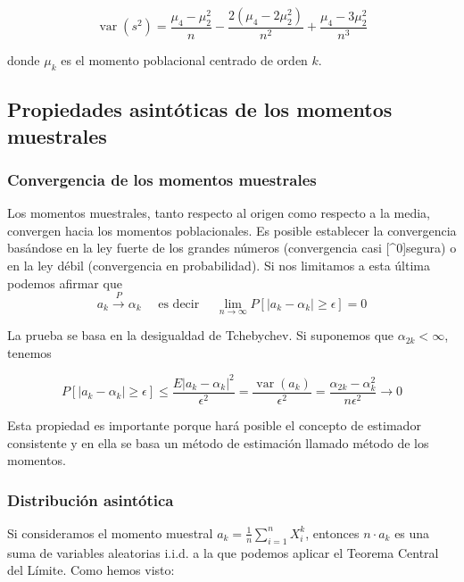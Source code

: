 \documentclass[
]{article}
\begin{document}
\[
\operatorname{var}\left(s^{2}\right)=\frac{\mu_{4}-\mu_{2}^{2}}{n}-\frac{2\left(\mu_{4}-2 \mu_{2}^{2}\right)}{n^{2}}+\frac{\mu_{4}-3 \mu_{2}^{2}}{n^{3}}
\]

donde \(\mu_{k}\) es el momento poblacional centrado de orden \(k\).

\subsection{Propiedades asintóticas de los momentos muestrales}\label{propiedades-asintuxf3ticas-de-los-momentos-muestrales}

\subsubsection{Convergencia de los momentos muestrales}\label{convergencia-de-los-momentos-muestrales}

Los momentos muestrales, tanto respecto al origen como respecto a la media, convergen hacia los momentos poblacionales. Es posible establecer la convergencia basándose en la ley fuerte de los grandes números (convergencia casi {[}\^{}0{]}segura) o en la ley débil (convergencia en probabilidad). Si nos limitamos a esta última podemos afirmar que
\[
a_{k} \xrightarrow{P} \alpha_{k} \quad \text { es decir } \quad \lim _{n \rightarrow \infty} P\left[\left|a_{k}-\alpha_{k}\right| \geq \epsilon\right]=0
\]

La prueba se basa en la desigualdad de Tchebychev. Si suponemos que \(\alpha_{2 k}<\infty\), tenemos

\[
P\left[\left|a_{k}-\alpha_{k}\right| \geq \epsilon\right] \leq \frac{E\left|a_{k}-\alpha_{k}\right|^{2}}{\epsilon^{2}}=\frac{\operatorname{var}\left(a_{k}\right)}{\epsilon^{2}}=\frac{\alpha_{2 k}-\alpha_{k}^{2}}{n \epsilon^{2}} \longrightarrow 0
\]

Esta propiedad es importante porque hará posible el concepto de estimador consistente y en ella se basa un método de estimación llamado método de los momentos.

\subsubsection{Distribución asintótica}\label{distribuciuxf3n-asintuxf3tica}

Si consideramos el momento muestral \(a_{k}=\frac{1}{n} \sum_{i=1}^{n} X_{i}^{k}\), entonces \(n \cdot a_{k}\) es una suma de variables aleatorias i.i.d. a la que podemos aplicar el Teorema Central del Límite. Como hemos visto:
\end{document}
